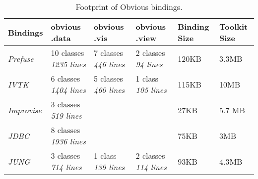 \begin{table}[t]
\small
\begin{tabular}{|p{\tableCol}|p{\tableCol}|p{\tableCol}|p{\tableCol}|p{\tableCol}|p{\tableCol}|}
    \hline
    \textbf{Bindings} & \textbf{obvious\newline{.data}} & \textbf{obvious\newline{.vis}} & \textbf{obvious\newline{.view}} & \textbf{Binding Size} & \textbf{Toolkit Size} \\
    \hline
    \textit{Prefuse} & 10 classes \newline\textit{1235 lines} & 7 classes \newline\textit{446 lines} & 2 classes \newline\textit{94 lines} & 120KB & 3.3MB \\
    \hline
    \textit{IVTK} & 6 classes \newline\textit{1404 lines} & 5 classes \newline\textit{460 lines} & 1 class \newline\textit{105 lines} & 115KB & 10MB \\
    \hline
    \textit{Improvise} & 3 classes \newline\textit{519 lines} &  &  & 27KB &  5.7 MB \\
    \hline
    \textit{JDBC} & 8 classes \newline\textit{1936 lines} &  &  & 75KB & 3MB \\
    \hline
    \textit{JUNG} & 3 classes \newline\textit{714 lines} & 1 class \newline\textit{139 lines} & 2 classes \newline\textit{114 lines} & 93KB & 4.3MB \\
    \hline
\end{tabular}
\caption{Footprint of Obvious bindings. }\label{tab:obviousfootprint}
\end{table}
